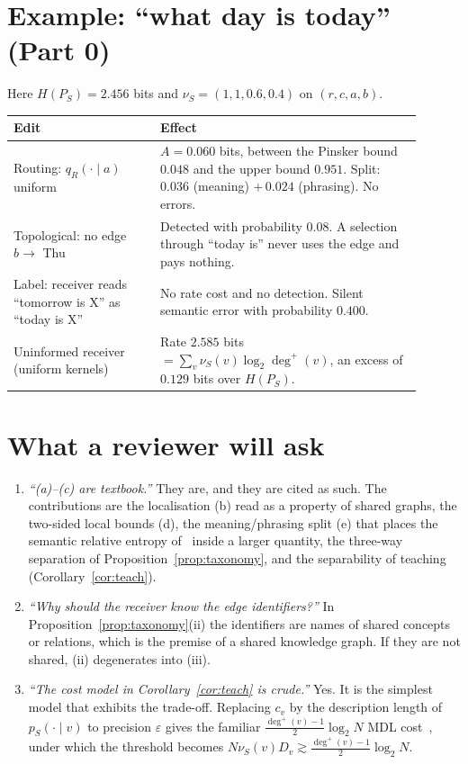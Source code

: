 \documentclass[11pt]{article}
\theoremstyle{definition}
\theoremstyle{remark}
\begin{document}
\section{Example: ``what day is today'' (Part 0)}

Here $H(P_S)=2.456$ bits and $\nu_S=(1,1,0.6,0.4)$ on $(r,c,a,b)$.
\begin{center}
\begin{tabular}{p{0.32\linewidth}p{0.58\linewidth}}
\toprule
Edit & Effect \\
\midrule
Routing: $q_R(\cdot\mid a)$ uniform & $A=0.060$ bits, between the Pinsker bound $0.048$ and the upper bound $0.951$. Split: $0.036$ (meaning) $+\,0.024$ (phrasing). No errors.\\
Topological: no edge $b\to$ Thu & Detected with probability $0.08$. A selection through ``today is'' never uses the edge and pays nothing.\\
Label: receiver reads ``tomorrow is X'' as ``today is X'' & No rate cost and no detection. Silent semantic error with probability $0.400$.\\
Uninformed receiver (uniform kernels) & Rate $2.585$ bits $=\sum_v\nu_S(v)\log_2\deg^+(v)$, an excess of $0.129$ bits over $H(P_S)$.\\
\bottomrule
\end{tabular}
\end{center}

\section{What a reviewer will ask}

\begin{enumerate}
\item \emph{``(a)--(c) are textbook.''} They are, and they are cited as such. The contributions are the localisation (b) read as a property of shared graphs, the two-sided local bounds (d), the meaning/phrasing split (e) that places the semantic relative entropy of~\cite{niu2025} inside a larger quantity, the three-way separation of Proposition~\ref{prop:taxonomy}, and the separability of teaching (Corollary~\ref{cor:teach}).
\item \emph{``Why should the receiver know the edge identifiers?''} In Proposition~\ref{prop:taxonomy}(ii) the identifiers are names of shared concepts or relations, which is the premise of a shared knowledge graph. If they are not shared, (ii) degenerates into (iii).
\item \emph{``The cost model in Corollary~\ref{cor:teach} is crude.''} Yes. It is the simplest model that exhibits the trade-off. Replacing $c_v$ by the description length of $p_S(\cdot\mid v)$ to precision $\varepsilon$ gives the familiar $\tfrac{\deg^+(v)-1}{2}\log_2N$ MDL cost~\cite{barron1998}, under which the threshold becomes $N\nu_S(v)D_v\gtrsim\tfrac{\deg^+(v)-1}{2}\log_2N$.
\end{enumerate}
\end{document}
